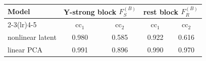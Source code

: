 {\scriptsize\setlength{\tabcolsep}{4pt}
\begin{tabular}{l c c c c}
\toprule
Model & \multicolumn{2}{c}{Y-strong block $F^{(B)}_S$} & \multicolumn{2}{c}{rest block $F^{(B)}_R$} \\
\cmidrule(lr){2-3}\cmidrule(lr){4-5}
& cc$_1$ & cc$_2$ & cc$_1$ & cc$_2$ \\
\midrule
nonlinear latent & 0.980 & 0.585 & 0.922 & 0.616 \\
linear PCA & 0.991 & 0.896 & 0.990 & 0.970 \\
\bottomrule
\end{tabular}}
